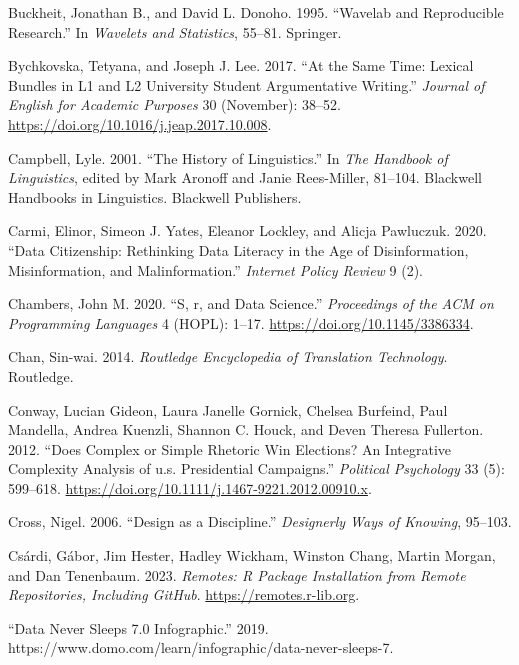 \documentclass[
  letterpaper,
]{latex/krantz}
\newlength{\cslhangindent}
\newenvironment{CSLReferences}[2] %
 {\begin{list}{}{%
  \setlength{\itemindent}{0pt}
  \setlength{\leftmargin}{0pt}
  \setlength{\parsep}{0pt}
  \ifodd #1
   \setlength{\leftmargin}{\cslhangindent}
   \setlength{\itemindent}{-1\cslhangindent}
  \fi
  \setlength{\itemsep}{#2\baselineskip}}}
 {\end{list}}
\theoremstyle{definition}
\theoremstyle{remark}
\begin{document}
\begin{CSLReferences}{1}{0}
Buckheit, Jonathan B., and David L. Donoho. 1995. {``Wavelab and
Reproducible Research.''} In \emph{Wavelets and Statistics}, 55--81.
Springer.

Bychkovska, Tetyana, and Joseph J. Lee. 2017. {``At the Same Time:
Lexical Bundles in L1 and L2 University Student Argumentative
Writing.''} \emph{Journal of English for Academic Purposes} 30
(November): 38--52. \url{https://doi.org/10.1016/j.jeap.2017.10.008}.

Campbell, Lyle. 2001. {``The History of Linguistics.''} In \emph{The
Handbook of Linguistics}, edited by Mark Aronoff and Janie Rees-Miller,
81--104. Blackwell Handbooks in Linguistics. Blackwell Publishers.

Carmi, Elinor, Simeon J. Yates, Eleanor Lockley, and Alicja Pawluczuk.
2020. {``Data Citizenship: Rethinking Data Literacy in the Age of
Disinformation, Misinformation, and Malinformation.''} \emph{Internet
Policy Review} 9 (2).

Chambers, John M. 2020. {``S, r, and Data Science.''} \emph{Proceedings
of the ACM on Programming Languages} 4 (HOPL): 1--17.
\url{https://doi.org/10.1145/3386334}.

Chan, Sin-wai. 2014. \emph{Routledge Encyclopedia of Translation
Technology}. Routledge.

Conway, Lucian Gideon, Laura Janelle Gornick, Chelsea Burfeind, Paul
Mandella, Andrea Kuenzli, Shannon C. Houck, and Deven Theresa Fullerton.
2012. {``Does Complex or Simple Rhetoric Win Elections? An Integrative
Complexity Analysis of u.s. Presidential Campaigns.''} \emph{Political
Psychology} 33 (5): 599--618.
\url{https://doi.org/10.1111/j.1467-9221.2012.00910.x}.

Cross, Nigel. 2006. {``Design as a Discipline.''} \emph{Designerly Ways
of Knowing}, 95--103.

Csárdi, Gábor, Jim Hester, Hadley Wickham, Winston Chang, Martin Morgan,
and Dan Tenenbaum. 2023. \emph{Remotes: R Package Installation from
Remote Repositories, Including GitHub}. \url{https://remotes.r-lib.org}.

{``Data Never Sleeps 7.0 Infographic.''} 2019.
https://www.domo.com/learn/infographic/data-never-sleeps-7.


\end{CSLReferences}
\end{document}
